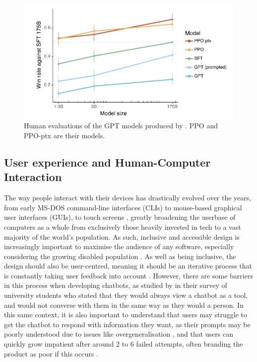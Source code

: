 \documentclass[12pt]{report}
\begin{document}
    \begin{figure} 
        \centering
        \includegraphics[width=.8\linewidth]{ouyangLLMPreference.png}
        \caption{Human evaluations of the GPT models produced by \textcite{ouyang_training_2022}. PPO and PPO-ptx are their models.}
        \label{fig:LLMPref}
    \end{figure}


    \subsection{User experience and Human-Computer Interaction}
    The way people interact with their devices has drastically evolved over the years, from early MS-DOS command-line 
    interfaces (CLIs) to mouse-based graphical user interfaces (GUIs), to touch screens \autocite{kotian_systematic_2024}, greatly broadening
    the userbase of computers as a whole from exclusively those heavily invested in tech to a vast majority of the world's 
    population. As such, inclusive and accessible design is increasingly important to maximise the audience of any software,
    especially considering the growing disabled population \autocite{putnam_how_2012}. As well as being inclusive, the design 
    should also be user-centred, meaning it should be an iterative process that is constantly taking user feedback 
    into account \autocite{chammas_closer_2015}. However, there are some barriers in this process when developing 
    chatbots, as studied by \textcite{clark_what_2019} in their survey of university students who stated that they would 
    always view a chatbot as a tool, and would not converse with them in the same way as they would a person. 
    In this same context, it is also important to understand that users may struggle
    to get the chatbot to respond with information they want, as their prompts may be poorly understood
    due to issues like overgeneralisation \autocite{zamfirescu-pereira_why_2023}, and that users can quickly 
    grow impatient after around 2 to 6 failed attempts, often branding the product as poor if this occurs \autocite{luger_like_2016}.
\end{document}
